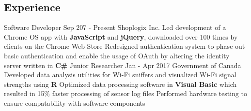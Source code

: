 \documentclass[]{aanguyen_res}
\begin{document}
	\begin{main}%
		\vspace{35pt}%
		\section{Experience}
			\mainentry%
				{Software Developer}%
				{Sep 207 - Present}%
				{Shoplogix Inc.}%
				{}%
				{\faCaretRight Led development of a Chrome OS app with \textbf{JavaScript} and \textbf{jQuery}, downloaded over 100 times by clients on the Chrome Web Store
				\faCaretRight Redesigned authentication system to phase out basic authentication and enable the usage of OAuth by altering the identity server written in \textbf{C\#}}
			\vspace{0.1cm}%
			\mainentry%
				{Junior Researcher}%
				{Jan - Apr 2017}%
				{Government of Canada}%
				{}%
				{\faCaretRight Developed data analysis utilities for Wi-Fi sniffers and visualized Wi-Fi signal strengths using \textbf{R}
				  \faCaretRight Optimized data processing software in \textbf{Visual Basic} which resulted in 15\% faster processing of sensor log files
				  \faCaretRight Performed hardware testing to ensure compatability with software components}
			\vspace{0.65cm}%

\end{main}
\end{document}
